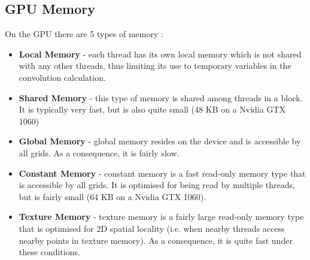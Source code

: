 \documentclass[10pt]{article}
\begin{document}
\subsection{GPU Memory}
On the GPU there are 5 types of memory \cite{wang19}:
\begin{itemize}
\item \textbf{Local Memory} - each thread has its own local memory which is not shared with any other threads, thus limiting its use to temporary variables in the convolution calculation.
\item \textbf{Shared Memory} - this type of memory is shared among threads in a block. It is typically very fast, but is also quite small (48 KB on a Nvidia GTX 1060\cite{nvidia19})
\item \textbf{Global Memory} - global memory resides on the device and is accessible by all grids. As a consequence, it is fairly slow.
\item \textbf{Constant Memory} - constant memory is a fast read-only memory type that is accessible by all grids. It is optimised for being read by multiple threads, but is fairly small (64 KB on a Nvidia GTX 1060\cite{nvidia19}).
\item \textbf{Texture Memory} - texture memory is a fairly large read-only memory type that is optimised for 2D spatial locality (i.e. when nearby threads access nearby points in texture memory). As a consequence, it is quite fast under these conditions.
\end{itemize}
\end{document}
